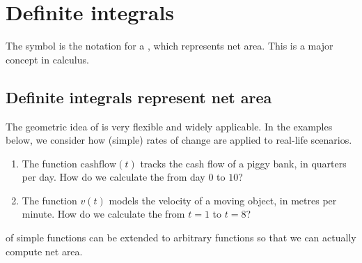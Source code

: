 \documentclass[../main.tex]{subfiles}
\begin{document}
 \section{Definite integrals}

The symbol  is the notation for a , which represents net area.  This is a major concept in calculus.

\subsection{Definite integrals represent net area} \label{subsec:defint-meaning} 
The geometric idea of  is very flexible and widely applicable. In the examples below, we consider how (simple) rates of change are applied to real-life scenarios. 

\begin{enumerate}[wide]
  \item \label{item:cashflow-example} The function \(\text{cashflow}(t)\) tracks the cash flow of a piggy bank, in quarters per day. How do we calculate the  from day \(0\) to \(10\)?

    \begin{center}
      
    \end{center}

    \blanks*

  \item \label{item:velocity-example} The function \(v(t)\) models the velocity of a moving object, in metres per minute.  How do we calculate the  from \(t=1\) to \(t = 8\)?

    \begin{center}
      
    \end{center}

    \blanks*

\end{enumerate}
\clearpage

 of simple functions can be extended to arbitrary functions so that we can actually compute net area.
\end{document}
